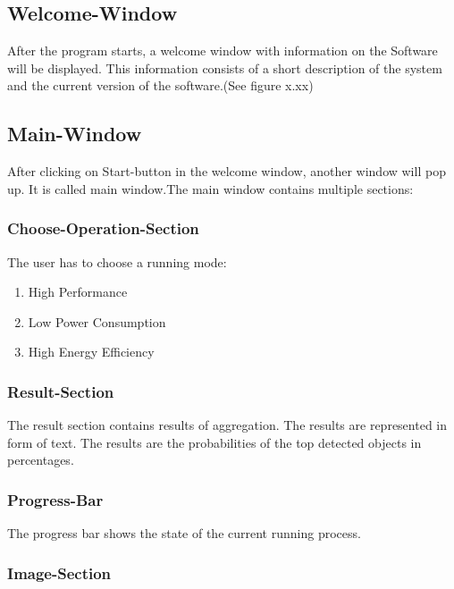 \documentclass[parskip=full]{scrartcl}
\begin{document}
\subsection {Welcome-Window}

After the program starts, a welcome window with information on the Software will be displayed. This information consists of a short description of the  system and the current version of the software.(See figure x.xx)

\subsection {Main-Window}

After clicking on Start-button in the welcome window, another window will pop up. It is called main window.The main window contains multiple sections: 

\subsubsection {Choose-Operation-Section}

 The user has to choose a running mode:

\begin{enumerate}
	\item High Performance
	\item Low Power Consumption
	\item High Energy Efficiency
\end{enumerate}

\subsubsection {Result-Section}

The result section contains results of aggregation. The results are represented in form of text. The results are the probabilities of the top detected objects in percentages.

\subsubsection {Progress-Bar}

The progress bar shows the state of the current running process.

\subsubsection {Image-Section}
\end{document}

